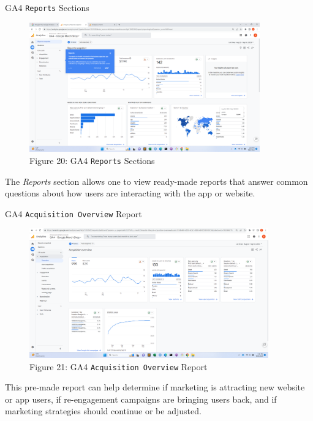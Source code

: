 \documentclass[pdf]{beamer}
\theoremstyle{remark}
\theoremstyle{definition}
\begin{document}
\begin{frame}[t]{GA4 \texttt{Reports} Sections}
\begin{figure}[htbp]
  \captionsetup{justification=centering}
  \includegraphics[height=5.6cm, trim=1.5cm 0.0cm 2.0cm 0.0cm width=5.6cm]{Images/G4A_6c_091923_Reports.png}
  \caption{Figure {\color{franklinblue} 20}: GA4 \texttt{Reports} Sections}
\end{figure}
\vspace{-2.0ex}
\small 
 The \textit{Reports} section allows one to view ready-made reports that answer common questions about how users are interacting with the app or website.
\end{frame}

\begin{frame}[t]{GA4 \texttt{Acquisition Overview} Report}
\begin{figure}[htbp]
  \captionsetup{justification=centering}
  \includegraphics[height=5.6cm, trim=1.5cm 0.0cm 2.0cm 0.0cm width=5.6cm]{Images/G4A_8a_091923_Acquisition_Overview.png}
  \caption{Figure {\color{franklinblue} 21}: GA4 \texttt{Acquisition Overview} Report}
\end{figure}
\vspace{-2.0ex}
\small 
This pre-made report can help determine if marketing is attracting new website or app users, if re-engagement campaigns are bringing users back, and if marketing strategies should continue or be adjusted.
\end{frame}
\end{document}
